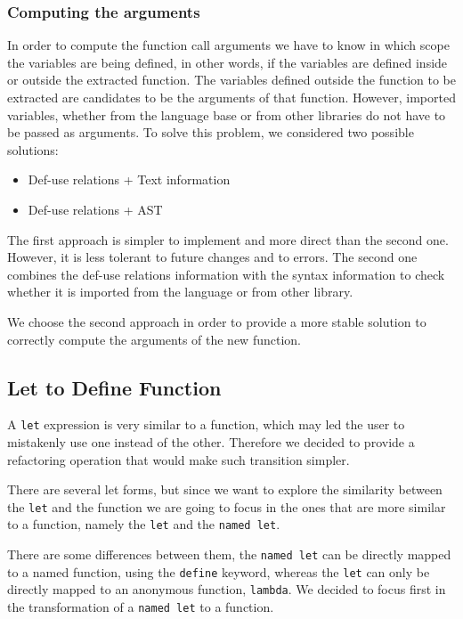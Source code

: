 \subsubsection{Computing the arguments}

In order to compute the function call arguments we have to know in
which scope the variables are being defined, in other words, if the
variables are defined inside or outside the extracted
function. %
The variables defined outside the function to be extracted are
candidates to be the arguments %
of that function.  However, imported variables, whether from the
language base or from other libraries do not have to be passed as
arguments. To solve this problem, we considered two possible
solutions:

\begin{itemize}
\item Def-use relations + Text information
\item Def-use relations + AST
\end{itemize}

The first approach is simpler to implement and more direct than the
second one.  However, it is less tolerant to future changes and to
errors.  The second one combines the def-use relations information
with the syntax information to check whether it is imported from the
language or from other library.

We choose the second approach in order to provide a more stable
solution to correctly compute the arguments of the new function.

\subsection{Let to Define Function}
A {\tt let} expression is very similar to a function, which may led the user
to mistakenly use one instead of the other.
Therefore we decided to provide a refactoring operation that would make such transition simpler.


There are several let forms, but since we want to explore the similarity between the {\tt let} and the function
we are going to focus in the ones that are more similar to a function, namely the {\tt let} and the {\tt named let}.

There are some differences between them, the {\tt named let} can be directly mapped to a named function, using the {\tt define} keyword,
whereas the {\tt let} can only be directly mapped to an anonymous function, {\tt lambda}.
We decided to focus first in the transformation of a {\tt named let} to a function.

